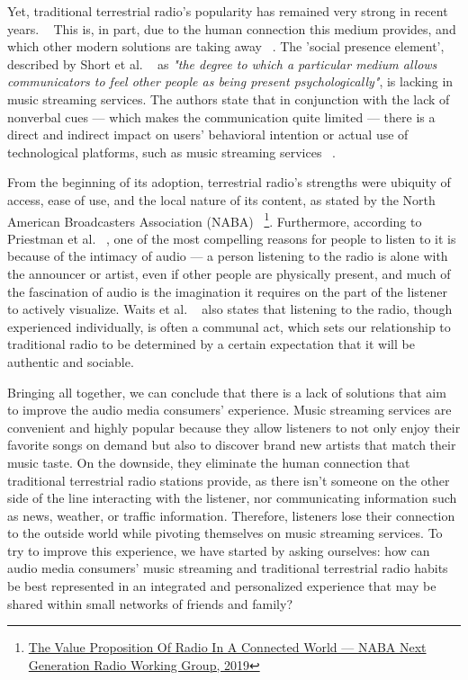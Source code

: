 Yet, traditional terrestrial radio's popularity has remained very strong in recent years. ~\cite{Albarran2007} This is, in part, due to the human connection this medium provides, and which other modern solutions are taking away ~\cite{Waits2007}. The 'social presence element', described by Short et al. ~\cite{JohnShortEderynWilliams1976} as \textit{"the degree to which a particular medium allows communicators to feel other people as being present psychologically"}, is lacking in music streaming services. The authors state that in conjunction with the lack of nonverbal cues —  which makes the communication quite limited — there is a direct and indirect impact on users’ behavioral intention or actual use of technological platforms, such as music streaming services ~\cite{Wang2014}.

From the beginning of its adoption, terrestrial radio's strengths were ubiquity of access, ease of use, and the local nature of its content, as stated by the North American Broadcasters Association (NABA) ~\footnote{\href{https://nabanet.com/wp-content/uploads/2019/03/NGR-WG-Value-Proposition-of-Radio-in-a-Connected-World-2019-03-15.pdf}{The Value Proposition Of Radio In A Connected World — NABA Next Generation Radio Working Group, 2019}}. Furthermore, according to Priestman et al. ~\cite{Priestman2005}, one of the most compelling reasons for people to listen to it is because of the intimacy of audio — a person listening to the radio is alone with the announcer or artist, even if other people are physically present, and much of the fascination of audio is the imagination it requires on the part of the listener to actively visualize. Waits et al. ~\cite{Waits2007} also states that listening to the radio, though experienced individually, is often a communal act, which sets our relationship to traditional radio to be determined by a certain expectation that it will be authentic and sociable.

Bringing all together, we can conclude that there is a lack of solutions that aim to improve the audio media consumers' experience. Music streaming services are convenient and highly popular because they allow listeners to not only enjoy their favorite songs on demand but also to discover brand new artists that match their music taste. On the downside, they eliminate the human connection that traditional terrestrial radio stations provide, as there isn't someone on the other side of the line interacting with the listener, nor communicating information such as news, weather, or traffic information. Therefore, listeners lose their connection to the outside world while pivoting themselves on music streaming services. To try to improve this experience, we have started by asking ourselves: how can audio media consumers' music streaming and traditional terrestrial radio habits be best represented in an integrated and personalized experience that may be shared within small networks of friends and family?

